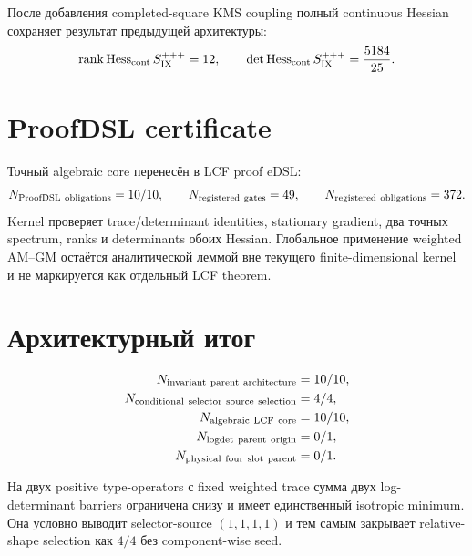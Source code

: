 После добавления completed-square KMS coupling полный continuous Hessian
сохраняет результат предыдущей архитектуры:
\begin{equation}
 \operatorname{rank}\operatorname{Hess}_{\rm cont}S_{\rm IX}^{+++}=12,
 \qquad
 \det\operatorname{Hess}_{\rm cont}S_{\rm IX}^{+++}=\frac{5184}{25}.
 \label{eq:v9-kms-shape-invariant-parent-common-hessian}
\end{equation}

\section{ProofDSL certificate}

Точный algebraic core перенесён в LCF proof eDSL:
\begin{equation}
 N_{\rm ProofDSL\ obligations}=10/10,
 \qquad
 N_{\rm registered\ gates}=49,
 \qquad
 N_{\rm registered\ obligations}=372.
 \label{eq:v9-kms-shape-invariant-parent-proofdsl}
\end{equation}
Kernel проверяет trace/determinant identities, stationary gradient, два
точных spectrum, ranks и determinants обоих Hessian. Глобальное применение
weighted AM--GM остаётся аналитической леммой вне текущего
finite-dimensional kernel и не маркируется как отдельный LCF theorem.

\section{Архитектурный итог}

\begin{equation}
 \begin{aligned}
 N_{\rm invariant\ parent\ architecture}&=10/10,\\
 N_{\rm conditional\ selector\ source\ selection}&=4/4,\\
 N_{\rm algebraic\ LCF\ core}&=10/10,\\
 N_{\rm logdet\ parent\ origin}&=0/1,\\
 N_{\rm physical\ four\ slot\ parent}&=0/1.
 \end{aligned}
 \label{eq:v9-kms-shape-invariant-parent-ledger}
\end{equation}

\begin{theorem}
На двух positive type-operators с fixed weighted trace сумма двух
log-determinant barriers ограничена снизу и имеет единственный isotropic
minimum. Она условно выводит selector-source $(1,1,1,1)$ и тем самым
закрывает relative-shape selection как $4/4$ без component-wise seed.
\end{theorem}

